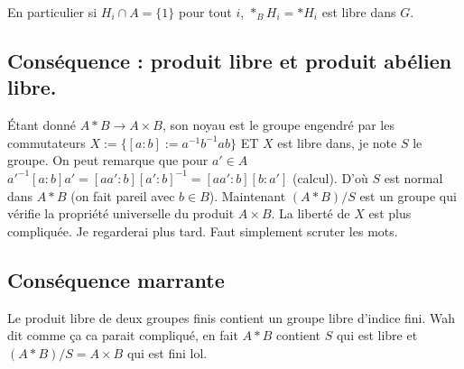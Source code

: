 \documentclass[a4paper,12pt]{book}
\theoremstyle{plain}
\theoremstyle{definition}
\theoremstyle{remark}
\begin{document}
En particulier si $H_i\cap A = \{1\}$ pour tout $i$,
$*_B H_i=* H_i$ est libre dans $G$. 

\subsection{Conséquence : produit libre et produit abélien libre.}
Étant donné $A*B\to A\times B$, son noyau est le groupe engendré
par les commutateurs $X:=\{[a:b]:=a^{-1}b^{-1}ab\}$ ET $X$ est
libre dans, je note $S$ le groupe. On peut remarque que pour
$a'\in A$ $a'^{-1}[a:b]a'=[aa':b][a':b]^{-1}=[aa':b][b:a']$
(calcul). D'où $S$ est normal dans $A*B$ (on fait pareil avec
$b\in B$). Maintenant $(A*B)/S$ est un groupe qui vérifie la
propriété universelle du produit $A\times B$. La liberté de $X$
est plus compliquée. Je regarderai plus tard. Faut simplement
scruter les mots. 

\subsection{Conséquence marrante}
Le produit libre de deux groupes finis contient un groupe libre
d'indice fini. Wah dit comme ça ca parait compliqué, en fait
$A*B$ contient $S$ qui est libre et $(A*B)/S = A\times B$ qui
est fini lol.




\end{document}
